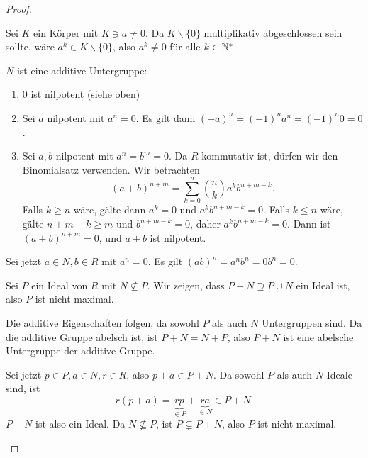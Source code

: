 \begin{proof}
	\begin{parts}
	\item Sei $K$ ein Körper mit $K\ni a\neq 0$. Da $K \backslash\{0\} $ multiplikativ abgeschlossen sein sollte, wäre $a^k\in K \backslash \{0\} $, also  $a^k\neq 0$ f\"{u}r alle $k\in \mathbb{N}^*$
	\item $N$ ist eine additive Untergruppe:
		\begin{enumerate}[label=(\roman*)]
			\item $0$ ist nilpotent (siehe oben)
			\item Sei $a$ nilpotent mit $a^n=0$. Es gilt dann $(-a)^n=(-1)^n a^n=(-1)^n 0=0$.
			\item Sei $a,b$ nilpotent mit $a^n=b^m=0$. Da $R$ kommutativ ist, dürfen wir den Binomialsatz verwenden. Wir betrachten
				\[
					(a+b)^{n+m}=\sum_{k=0}^n \binom{n}{k} a^k b^{n+m-k}
				.\]
				Falls $k\ge n$ wäre, gälte dann $a^k=0$ und $a^k b^{n+m-k}=0$. Falls $k\le n$ wäre, gälte $n+m-k\ge m$ und $b^{n+m-k}=0$, daher $a^k b^{n+m-k}=0$. Dann ist $(a+b)^{n+m}=0$, und $a+b$ ist nilpotent.
		\end{enumerate}
		Sei jetzt $a\in N,b\in R$ mit $a^n=0$. Es gilt $(ab)^n=a^nb^n=0b^n=0$.
	\item Sei $P$ ein Ideal von $R$ mit $N\not\subseteq P$. Wir zeigen, dass $P+N\supseteq P\cup N$ ein Ideal ist, also $P$ ist nicht maximal. 

		Die additive Eigenschaften folgen, da sowohl $P$ als auch $N$ Untergruppen sind. Da die additive Gruppe abelsch ist, ist $P+N=N+P$, also $P+N$ ist eine abelsche Untergruppe der additive Gruppe.

		Sei jetzt $p\in P, a\in N,r\in R$, also $p+a\in P+N$. Da sowohl $P$ als auch $N$ Ideale sind, ist
		\[
			r(p+a)=\underbrace{rp}_{\in P}+\underbrace{ra}_{\in N}\in P+N
		.\] 
		$P+N$ ist also ein Ideal. Da $N\not\subseteq P$, ist $P\subsetneq P+N$, also $P$ ist nicht maximal.\qedhere
	\end{parts}
\end{proof}
